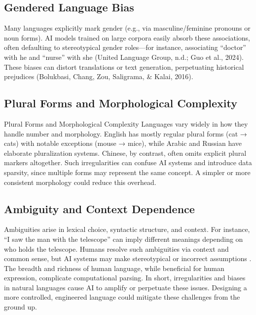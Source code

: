 \documentclass{article} %
\begin{document}
\subsection{Gendered Language Bias}
Many languages explicitly mark gender (e.g., via masculine/feminine pronouns or noun forms). AI models trained on large corpora easily absorb these associations, often defaulting to stereotypical gender roles—for instance, associating “doctor” with he and “nurse” with she \cite{UnitedLanguageGroup, Guo2024} (United Language Group, n.d.; Guo et al., 2024). These biases can distort translations or text generation, perpetuating historical prejudices \cite{Bolukbasi2016} (Bolukbasi, Chang, Zou, Saligrama, \& Kalai, 2016).

\subsection{Plural Forms and Morphological Complexity}
Plural Forms and Morphological Complexity
Languages vary widely in how they handle number and morphology. English has mostly regular plural forms (cat → cats) with notable exceptions (mouse → mice), while Arabic and Russian have elaborate pluralization systems. Chinese, by contrast, often omits explicit plural markers altogether. Such irregularities can confuse AI systems and introduce data sparsity, since multiple forms may represent the same concept. A simpler or more consistent morphology could reduce this overhead.

\subsection{Ambiguity and Context Dependence}
Ambiguities arise in lexical choice, syntactic structure, and context. For instance, “I saw the man with the telescope” can imply different meanings depending on who holds the telescope. Humans resolve such ambiguities via context and common sense, but AI systems may make stereotypical or incorrect assumptions \cite{Guo2024}. The breadth and richness of human language, while beneficial for human expression, complicate computational parsing.
In short, irregularities and biases in natural languages cause AI to amplify or perpetuate these issues. Designing a more controlled, engineered language could mitigate these challenges from the ground up.
\end{document}
